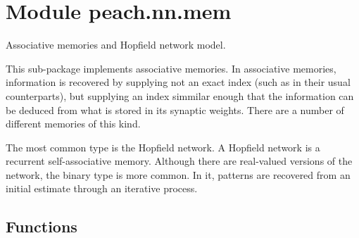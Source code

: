 %
%
%


\section{Module peach.nn.mem}

    \label{peach:nn:mem}

Associative memories and Hopfield network model.

This sub-package implements associative memories. In associative memories,
information is recovered by supplying not an exact index (such as in their
usual counterparts), but supplying an index simmilar enough that the information
can be deduced from what is stored in its synaptic weights. There are a number
of different memories of this kind.

The most common type is the Hopfield network. A Hopfield network is a recurrent
self-associative memory. Although there are real-valued versions of the network,
the binary type is more common. In it, patterns are recovered from an initial
estimate through an iterative process.


  \subsection{Functions}

    \label{peach:nn:nnet:randn}

    \vspace{0.5ex}


